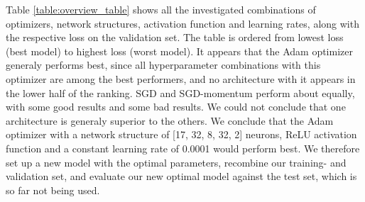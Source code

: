Table \ref{table:overview_table} shows all the investigated combinations of optimizers, network structures, activation function and learning rates, along with the respective loss on the validation set. The table is ordered from lowest loss (best model) to highest loss (worst model). It appears that the Adam optimizer generaly performs best, since all hyperparameter combinations with this optimizer are among the best performers, and no architecture with it appears in the lower half of the ranking. SGD and SGD-momentum perform about equally, with some good results and some bad results. We could not conclude that one architecture is generaly superior to the others.
We conclude that the Adam optimizer with a network structure of [17, 32, 8, 32, 2] neurons, ReLU activation function and a constant learning rate of 0.0001 would perform best.
We therefore set up a new model with the optimal parameters, recombine our training- and validation set, and evaluate our new optimal model against the test set, which is so far not being used.
